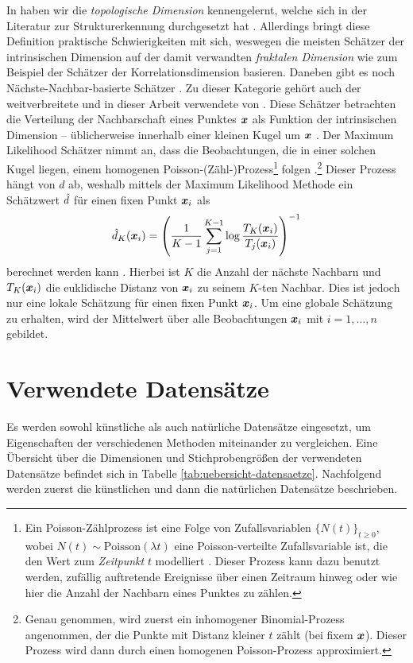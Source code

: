 In  haben wir die \textit{topologische
	Dimension} kennengelernt, welche sich in der Literatur zur Strukturerkennung durchgesetzt hat \parencite[1]{Campadelli.2015}. Allerdings bringt diese Definition praktische Schwierigkeiten mit sich,
weswegen die meisten Schätzer der intrinsischen Dimension auf der damit verwandten
\textit{fraktalen Dimension} wie zum Beispiel der Schätzer der Korrelationsdimension \parencite{Camastra.2002} basieren. Daneben gibt es noch Nächste-Nachbar-basierte Schätzer \parencite[1]{Campadelli.2015}. Zu dieser Kategorie gehört auch der weitverbreitete und in dieser
Arbeit verwendete  von \textcite{Levina.2004}. Diese Schätzer
betrachten die Verteilung der Nachbarschaft eines Punktes $\bm{x}$ als Funktion der
intrinsischen Dimension -- üblicherweise innerhalb einer kleinen Kugel um $\bm{x}$
\parencite[8]{Campadelli.2015}. Der Maximum Likelihood Schätzer nimmt an, dass die Beobachtungen, die
in einer solchen Kugel liegen, einem homogenen Poisson-(Zähl-)Prozess\footnote{Ein
Poisson-Zählprozess ist eine Folge von Zufallsvariablen $\{ N(t) \}_{t \geq 0}$, wobei $N(t) \sim
	\text{Poisson}(\lambda t)$ eine Poisson-verteilte Zufallsvariable ist, die den Wert zum
\textit{Zeitpunkt} $t$ modelliert \parencite[105 -- 117]{Jones.2018}. Dieser Prozess kann dazu benutzt werden, zufällig auftretende
Ereignisse über einen Zeitraum hinweg oder wie hier die Anzahl der Nachbarn eines Punktes zu
zählen.} folgen
\parencite[2]{Levina.2004}.\footnote{Genau genommen, wird zuerst ein inhomogener Binomial-Prozess
	angenommen, der die Punkte mit Distanz kleiner $t$ zählt (bei fixem $\bm{x}$). Dieser Prozess
	wird dann durch einen homogenen Poisson-Prozess approximiert.} Dieser Prozess hängt von $d$ ab,
weshalb mittels der Maximum Likelihood Methode ein Schätzwert $\hat{d}$ für einen fixen Punkt
$\bm{x}_i$ als
\begin{equation}
	\hat{d}_K(\bm{x}_i) = \left( \frac{1}{K - 1} \sum_{j=1}^{K - 1} \log \frac{T_K(\bm{x}_i)}{T_j(\bm{x}_i)} \right)^{-1}
\end{equation}
berechnet werden kann \parencite[4]{Levina.2004}. Hierbei ist $K$ die Anzahl der nächste Nachbarn und $T_{K}(\bm{x}_i)$ die
euklidische Distanz von $\bm{x}_i$ zu seinem $K$-ten Nachbar. Dies ist jedoch nur eine lokale
Schätzung für einen fixen Punkt $\bm{x}_i$. Um eine globale Schätzung zu erhalten, wird der
Mittelwert über alle Beobachtungen $\bm{x}_i$ mit $i = 1, \ldots, n$ gebildet.
\section{Verwendete Datensätze}
\label{ch:Vergleich:sec:VerwendeteDatensaetze}
Es werden sowohl künstliche als auch natürliche Datensätze eingesetzt, um Eigenschaften der
verschiedenen Methoden miteinander zu vergleichen. Eine Übersicht über die Dimensionen und Stichprobengrößen der verwendeten Datensätze befindet sich in Tabelle \ref{tab:uebersicht-datensaetze}. Nachfolgend werden zuerst die künstlichen und dann die natürlichen Datensätze beschrieben.

